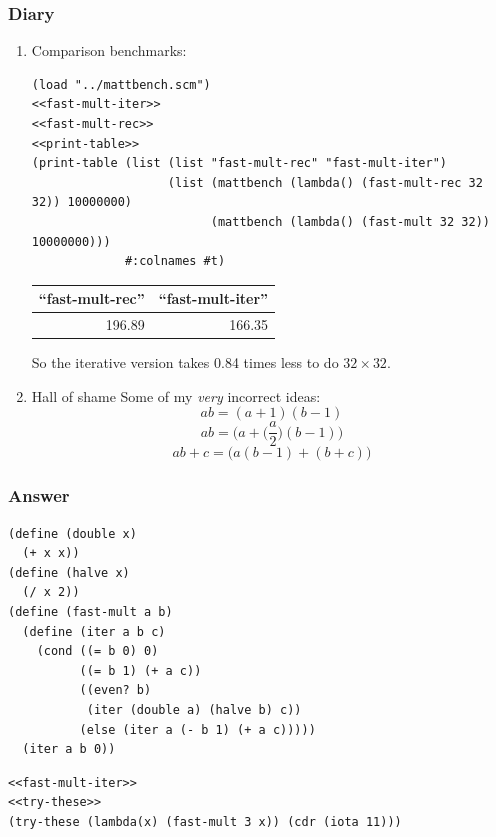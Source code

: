 \documentclass[final,fleqn,titlepage,twoside]{article}
\begin{document}
\subsubsection{Diary}
\label{sec:org1a36a1d}
\begin{enumerate}
\item Comparison benchmarks:
\label{sec:orgdaf3f6d}
\begin{verbatim}
(load "../mattbench.scm")
<<fast-mult-iter>>
<<fast-mult-rec>>
<<print-table>>
(print-table (list (list "fast-mult-rec" "fast-mult-iter")
                   (list (mattbench (lambda() (fast-mult-rec 32 32)) 10000000)
                         (mattbench (lambda() (fast-mult 32 32)) 10000000)))
             #:colnames #t)
\end{verbatim}

\begin{center}
\begin{tabular}{rr}
``fast-mult-rec'' & ``fast-mult-iter''\\[0pt]
\hline
196.89 & 166.35\\[0pt]
\end{tabular}
\end{center}

So the iterative version takes 0.84 times less to do \(32 \times 32\).

\item Hall of shame
\label{sec:org7da5ca6}
Some of my \emph{very} incorrect ideas:
\[ab = (a+1)(b-1)\]
\[ab = \big(a+\Big(\frac{a}{2}\Big)(b-1)\big)\]
\[ab+c = \big(a(b-1)+(b+c)\big)\]
\end{enumerate}

\subsubsection{Answer}
\label{sec:org35fcb1e}
\begin{verbatim}
(define (double x)
  (+ x x))
(define (halve x)
  (/ x 2))
(define (fast-mult a b)
  (define (iter a b c)
    (cond ((= b 0) 0)
          ((= b 1) (+ a c))
          ((even? b)
           (iter (double a) (halve b) c))
          (else (iter a (- b 1) (+ a c)))))
  (iter a b 0))
\end{verbatim}
\begin{verbatim}
<<fast-mult-iter>>
<<try-these>>
(try-these (lambda(x) (fast-mult 3 x)) (cdr (iota 11)))
\end{verbatim}
\end{document}
